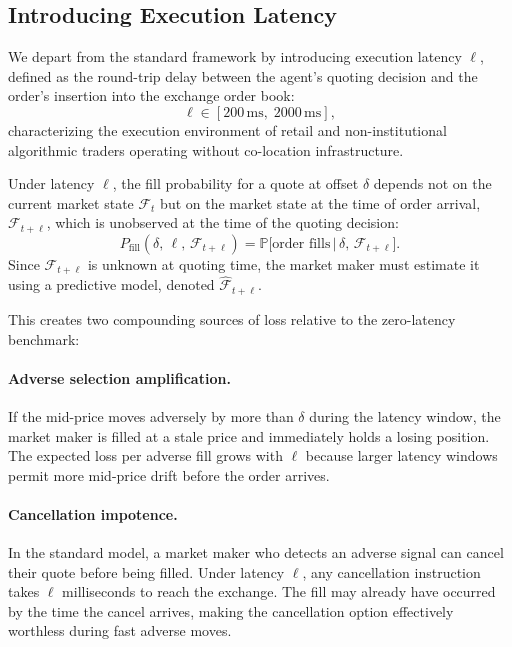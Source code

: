 \documentclass[12pt]{article}
\newcommand{\given}{\,|\,}
\begin{document}
\subsection{Introducing Execution Latency}

We depart from the standard framework by introducing execution latency $\ell$, defined as the round-trip delay between the agent's quoting decision and the order's insertion into the exchange order book:
\begin{equation}
  \ell \in [200\,\text{ms},\; 2000\,\text{ms}],
\end{equation}
characterizing the execution environment of retail and non-institutional algorithmic traders operating without co-location infrastructure.

Under latency $\ell$, the fill probability for a quote at offset $\delta$ depends not on the current market state $\mathcal{F}_t$ but on the market state at the time of order arrival, $\mathcal{F}_{t+\ell}$, which is unobserved at the time of the quoting decision:
\begin{equation}
  P_{\mathrm{fill}}(\delta,\, \ell,\, \mathcal{F}_{t+\ell}) = \mathbb{P}\bigl[\text{order fills} \given \delta,\, \mathcal{F}_{t+\ell}\bigr].
\end{equation}
Since $\mathcal{F}_{t+\ell}$ is unknown at quoting time, the market maker must estimate it using a predictive model, denoted $\hat{\mathcal{F}}_{t+\ell}$.

This creates two compounding sources of loss relative to the zero-latency benchmark:

\paragraph{Adverse selection amplification.} If the mid-price moves adversely by more than $\delta$ during the latency window, the market maker is filled at a stale price and immediately holds a losing position. The expected loss per adverse fill grows with $\ell$ because larger latency windows permit more mid-price drift before the order arrives.

\paragraph{Cancellation impotence.} In the standard model, a market maker who detects an adverse signal can cancel their quote before being filled. Under latency $\ell$, any cancellation instruction takes $\ell$ milliseconds to reach the exchange. The fill may already have occurred by the time the cancel arrives, making the cancellation option effectively worthless during fast adverse moves.
\end{document}

